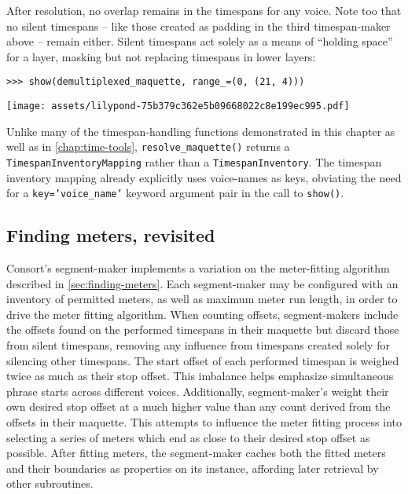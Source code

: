 \noindent After resolution, no overlap remains in the timespans for any voice.
Note too that no silent timespans -- like those created as padding in the third
timespan-maker above -- remain either. Silent timespans act solely as a means
of \enquote{holding space} for a layer, masking but not replacing timespans in
lower layers:

\begin{comment}
<abjad>
show(demultiplexed_maquette, range_=(0, (21, 4)))
</abjad>
\end{comment}

\begin{abjadbookoutput}
\begin{singlespacing}
\vspace{-0.5\baselineskip}
\begin{verbatim}
>>> show(demultiplexed_maquette, range_=(0, (21, 4)))
\end{verbatim}
\noindent\texttt{[image: assets/lilypond-75b379c362e5b09668022c8e199ec995.pdf]}
\end{singlespacing}
\end{abjadbookoutput}

\noindent Unlike many of the timespan-handling functions demonstrated in this
chapter as well as in \autoref{chap:time-tools}, \texttt{resolve\_maquette()}
returns a \texttt{TimespanInventoryMapping} rather than a
\texttt{TimespanInventory}. The timespan inventory mapping already
explicitly uses voice-names as keys, obviating the need for a
\texttt{key='voice\_name'} keyword argument pair in the call to
\texttt{show()}.

\subsection{Finding meters, revisited}
\label{ssec:finding-meters-revisited}

Consort's segment-maker implements a variation on the meter-fitting algorithm
described in \autoref{sec:finding-meters}. Each segment-maker may be configured
with an inventory of permitted meters, as well as maximum meter run length, in
order to drive the meter fitting algorithm. When counting offsets,
segment-makers include the offsets found on the performed timespans in their
maquette but discard those from silent timespans, removing any influence from
timespans created solely for silencing other timespans. The start offset of
each performed timespan is weighed twice as much as their stop offset. This
imbalance helps emphasize simultaneous phrase starts across different voices.
Additionally, segment-maker's weight their own desired stop offset at a much
higher value than any count derived from the offsets in their maquette. This
attempts to influence the meter fitting process into selecting a series of
meters which end as close to their desired stop offset as possible. After
fitting meters, the segment-maker caches both the fitted meters and their
boundaries as properties on its instance, affording later retrieval by other
subroutines.

